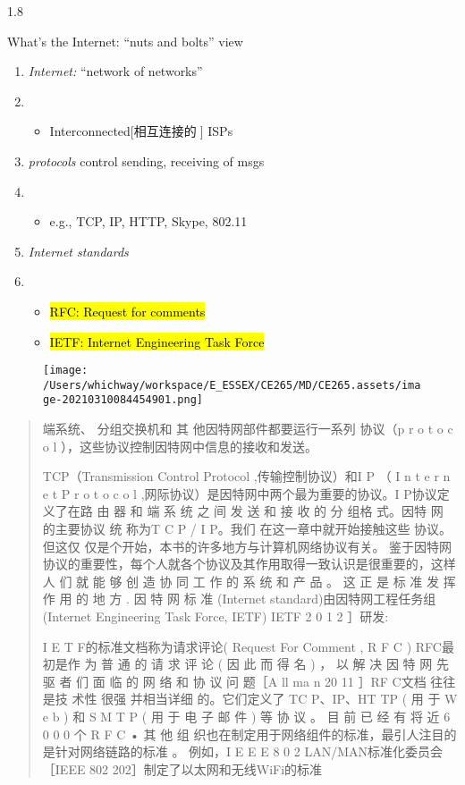 \documentclass[
]{article}
\begin{document}
1.8

What's the Internet: ``nuts and bolts'' view

\begin{enumerate}
\def\labelenumi{\arabic{enumi}.}
\item
  \emph{Internet:} ``network of networks''
\item
  \begin{itemize}
  \item
    Interconnected{[}相互连接的🔗{]} ISPs
  \end{itemize}
\item
  \emph{protocols} control sending, receiving of msgs
\item
  \begin{itemize}
  \item
    e.g., TCP, IP, HTTP, Skype, 802.11
  \end{itemize}
\item
  \emph{Internet standards}
\item
  \begin{itemize}
  \item
    \hl{RFC: Request for comments}
  \item
    \hl{IETF: Internet Engineering Task Force}
  \end{itemize}
\end{enumerate}

\begin{figure}
\centering
\texttt{[image: /Users/whichway/workspace/E\_ESSEX/CE265/MD/CE265.assets/image-20210310084454901.png]}
\caption{}
\end{figure}

\begin{quote}
端系统、 分组交换机和 其 他因特网部件都要运行一系列 协议（p r o t o c o
l ），这些协议控制因特网中信息的接收和发送。

TCP（Transmission Control Protocol ,传输控制协议）和I P （ I n t e r n e
t P r o t o c o l ,网际协议）是因特网中两个最为重要的协议。I
P协议定义了在路 由 器 和 端 系 统 之 间 发 送 和 接 收 的 分 组格
式。因特 网 的主要协议 统 称为T C P / I P。我们 在这一章中就开始接触这些
协议。 但这仅 仅是个开始，本书的许多地方与计算机网络协议有关。
鉴于因特网协议的重要性，每个人就各个协议及其作用取得一致认识是很重要的，这样
人 们 就 能 够 创 造 协 同 工 作 的 系 统 和 产 品 。 这 正 是 标 准 发
挥 作 用 的 地 方 . 因 特 网 标 准 (Internet
standard)由因特网工程任务组(Internet Engineering Task Force, IETF) IETF
2 0 1 2 ］研发:

I E T F的标准文档称为请求评论( Request For Comment , R F C ) RFC最初是作
为 普 通 的 请 求 评 论 ( 因 此 而 得 名 ) ， 以 解 决 因 特 网 先 驱 者
们 面 临 的 网 络 和 协 议 问 题［A ll ma n 20 11 ］RF C文档 往往 是技
术性 很强 并相当详细 的。它们定义了 TC P、IP、HT TP ( 用 于 W e b ) 和 S
M T P ( 用 于 电 子 邮 件 ) 等 协 议 。 目 前 已 经 有 将 近 6 0 0 0 个
R F C • 其 他 组
织也在制定用于网络组件的标准，最引人注目的是针对网络链路的标准 。
例如，I E E E 8 0 2 LAN/MAN标准化委员会［IEEE 802
202］制定了以太网和无线WiFi的标准
\end{quote}
\end{document}
